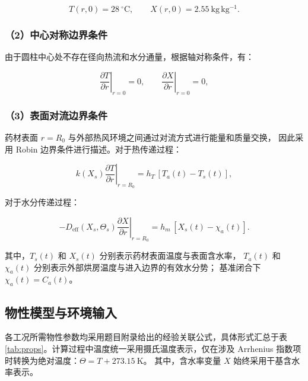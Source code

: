 \documentclass[withoutpreface,bwprint]{cumcmthesis}
\begin{document}
\begin{equation}
  T(r,0)=28\ ^\circ\mathrm{C},\qquad
  X(r,0)=2.55\ \mathrm{kg\,kg^{-1}}.
  \label{eq:ic}
\end{equation}

\subsubsection*{（2）中心对称边界条件}

由于圆柱中心处不存在径向热流和水分通量，根据轴对称条件，有：

\begin{equation}
  \left.\frac{\partial T}{\partial r}\right|_{r=0}=0,\qquad
  \left.\frac{\partial X}{\partial r}\right|_{r=0}=0,
  \label{eq:bc-center}
\end{equation}

\subsubsection*{（3）表面对流边界条件}

药材表面 $r=R_0$ 与外部热风环境之间通过对流方式进行能量和质量交换，
因此采用 Robin 边界条件进行描述。对于热传递过程：

\begin{equation}
  k(X_s)\left.\frac{\partial T}{\partial r}\right|_{r=R_0}
  =h_T\,[T_a(t)-T_s(t)],
  \label{eq:bc-T}
\end{equation}

对于水分传递过程：

\begin{equation}
  -D_{\mathrm{eff}}(X_s,\Theta_s)
  \left.\frac{\partial X}{\partial r}\right|_{r=R_0}
  =h_m\,[X_s(t)-\chi_a(t)].
  \label{eq:bc-X}
\end{equation}

其中，$T_s(t)$ 和 $X_s(t)$ 分别表示药材表面温度与表面含水率，
$T_a(t)$ 和 $\chi_a(t)$ 分别表示外部烘房温度与进入边界的有效水分势；
基准闭合下 $\chi_a(t)=C_a(t)$。

\subsection{物性模型与环境输入}

各工况所需物性参数均采用题目附录给出的经验关联公式，具体形式汇总于表
\ref{tab:props}。计算过程中温度统一采用摄氏温度表示，仅在涉及
Arrhenius 指数项时转换为绝对温度：$\Theta=T+273.15\ \mathrm{K}$。
其中，含水率变量 $X$ 始终采用干基含水率表示。
\end{document}
